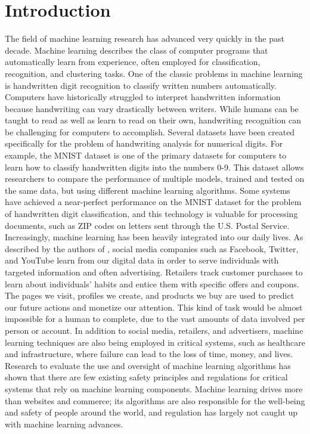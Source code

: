 \chapter{Introduction}

The field of machine learning research has advanced very quickly in the past decade. Machine learning describes the class of computer programs that automatically learn from experience, often employed for classification, recognition, and clustering tasks. One of the classic problems in machine learning is handwritten digit recognition to classify written numbers automatically. Computers have historically struggled to interpret handwritten information because handwriting can vary drastically between writers. While humans can be taught to read as well as learn to read on their own, handwriting recognition can be challenging for computers to accomplish. Several datasets have been created specifically for the problem of handwriting analysis for numerical digits. For example, the MNIST dataset \cite{LBBH98} is one of the primary datasets for computers to learn how to classify handwritten digits into the numbers 0-9. This dataset allows researchers to compare the performance of multiple models, trained and tested on the same data, but using different machine learning algorithms. Some systems have achieved a near-perfect performance on the MNIST dataset for the problem of handwritten digit classification, and this technology is valuable for processing documents, such as ZIP codes on letters sent through the U.S. Postal Service.
\\Increasingly, machine learning has been heavily integrated into our daily lives. As described by the authors of \cite{GHHA19}, social media companies such as Facebook, Twitter, and YouTube learn from our digital data in order to serve individuals with targeted information and often advertising. Retailers track customer purchases to learn about individuals' habits and entice them with specific offers and coupons. The pages we visit, profiles we create, and products we buy are used to predict our future actions and monetize our attention. This kind of task would be almost impossible for a human to complete, due to the vast amounts of data involved per person or account. In addition to social media, retailers, and advertisers, machine learning techniques are also being employed in critical systems, such as healthcare and infrastructure, where failure can lead to the loss of time, money, and lives. Research to evaluate the use and oversight of machine learning algorithms \cite{Var16} has shown that there are few existing safety principles and regulations for critical systems that rely on machine learning components. Machine learning drives more than websites and commerce; its algorithms are also responsible for the well-being and safety of people around the world, and regulation has largely not caught up with machine learning advances.
